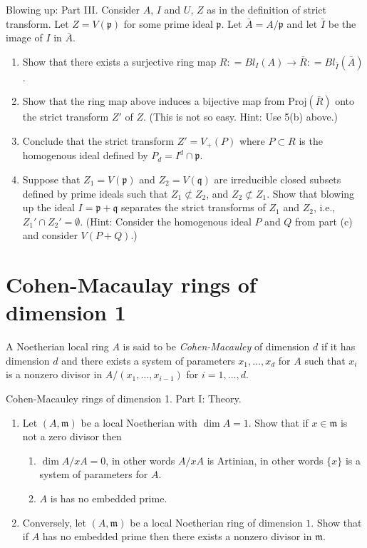 \begin{exercise}
\label{exercise-blwoing-up-III}
Blowing up: Part III.
Consider $A$, $I$ and $U$, $Z$ as in the definition of strict transform.
Let $Z = V({\mathfrak p})$ for some prime ideal ${\mathfrak p}$. Let $\bar A =
A/{\mathfrak p}$ and let
$\bar I$ be the image of $I$ in $\bar A$.
\begin{enumerate}
\item Show that there exists a surjective ring map
$R: = Bl_I(A) \to \bar R: = Bl_{\bar I}(\bar A)$.
\item Show that the ring map above induces a bijective map
from $\text{Proj}(\bar R)$ onto the strict transform $Z'$ of $Z$. (This
is not so easy. Hint: Use 5(b) above.)
\item Conclude that the strict transform $Z' = V_{+}(P)$ where
$P \subset R$ is the homogenous ideal defined by $P_d = I^d \cap {\mathfrak p}$.
\item Suppose that $Z_1 = V({\mathfrak p})$ and
$Z_2 = V({\mathfrak q})$ are irreducible
closed subsets defined by prime ideals such that  $Z_1 \not \subset Z_2$,
and $Z_2 \not \subset Z_1$. Show that blowing up the ideal
$I = {\mathfrak p} + {\mathfrak q}$ separates the
strict transforms of $Z_1$ and $Z_2$,
i.e., $Z_1' \cap Z_2' = \emptyset$. (Hint: Consider the homogenous
ideal $P$ and $Q$ from part (c) and consider $V(P + Q)$.)
\end{enumerate}
\end{exercise}


\section{Cohen-Macaulay rings of dimension 1}
\label{section-CM-dim-1}

\begin{definition}
\label{definition-CM}
A Noetherian local ring $A$ is said to be {\it Cohen-Macauley}
of dimension $d$ if it has dimension $d$ and there exists a system
of parameters $x_1, \ldots, x_d$ for $A$ such that $x_i$ is a nonzero
divisor in $A/(x_1, \ldots, x_{i-1})$ for $i = 1, \ldots, d$.
\end{definition}

\begin{exercise}
\label{exercise-CM-dim-1-I}
Cohen-Macauley rings of dimension 1. Part I: Theory.
\begin{enumerate}
\item Let $(A, {\mathfrak m})$ be a local Noetherian with $\dim A = 1$.
Show that if $x\in {\mathfrak m}$ is not a zero divisor then
\begin{enumerate}
\item $\dim A/xA = 0$, in other words $A/xA$ is Artinian,
in other words $\{x\}$ is a system of parameters for $A$.
\item $A$ is has no embedded prime.
\end{enumerate}
\item Conversely, let $(A, {\mathfrak m})$ be a local Noetherian ring of
dimension $1$. Show that if $A$ has no embedded prime then there exists
a nonzero divisor in ${\mathfrak m}$.
\end{enumerate}
\end{exercise}

